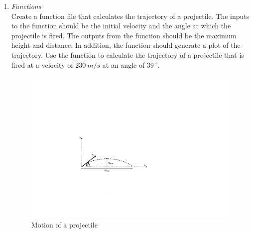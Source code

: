 \begin{enumerate}
\newpage
\item \textit{Functions}\\
Create a function file that calculates the trajectory of a projectile. The inputs to the function should be the initial velocity and the angle at which the projectile is fired. The outputs from the function should be the maximum height and distance. In addition, the function should generate a plot of the trajectory. Use the function to calculate the trajectory of a projectile that is fired at a velocity of $230~m/s$ at an angle of $39~^\circ$.
\begin{figure}[h]
	\myfloatalign
	\includegraphics[width=0.75\linewidth]{Graphics/Additional-Ex/projectile}
	\caption{Motion of a projectile}
	\label{fig:projectile}
\end{figure}


\end{enumerate}
